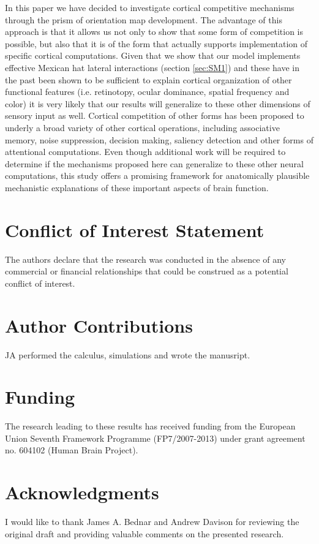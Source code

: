 \documentclass[utf8]{frontiersSCNS}
\begin{document}
In this paper we have decided to investigate cortical competitive mechanisms through the prism of orientation map development. The advantage of this approach is that it allows us not only to show that some form of competition is possible, but also that it is of the form that actually supports implementation of specific cortical computations. 
Given that we show that our model implements effective Mexican hat lateral interactions (section \ref{sec:SM1}) and these have in the past been shown to be sufficient to explain cortical organization of other functional features (i.e. retinotopy, ocular dominance, spatial frequency and color) it is very likely that our results will generalize to these other dimensions of sensory input as well. Cortical competition of other forms has been proposed to underly a broad variety of other cortical operations, including associative memory, noise suppression, decision making, saliency detection and other forms of attentional computations. Even though additional work will be required to determine if the mechanisms proposed here can generalize to these other neural computations, this study offers 
a promising framework for anatomically plausible mechanistic explanations of these important aspects of brain function.


\section*{Conflict of Interest Statement}

The authors declare that the research was conducted in the absence of any commercial or financial relationships that could be construed as a potential conflict of interest.

\section*{Author Contributions}

JA performed the calculus, simulations and wrote the manusript.

\section*{Funding}
The research leading to these results has received funding from the European Union Seventh Framework Programme (FP7/2007-2013) under grant
agreement no. 604102 (Human Brain Project).

\section*{Acknowledgments}
I would like to thank James A. Bednar and Andrew Davison for reviewing the original draft and 
providing valuable comments on the presented research.




\end{document}
